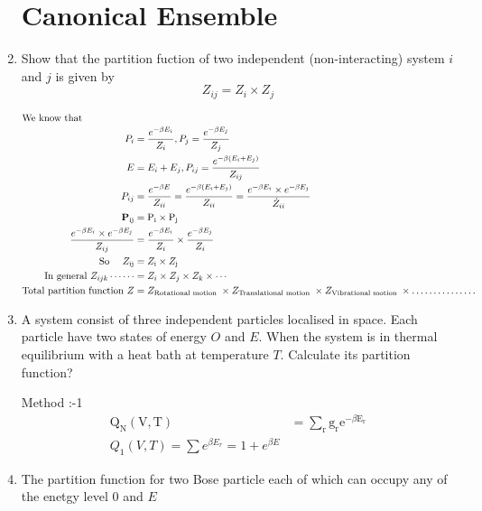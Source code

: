 \begin{enumerate}
 \section{Canonical Ensemble}
	\item Show that the partition fuction of two independent (non-interacting)
	system $i$ and $j$ is given by 
	$$Z_{ij}=Z_i\times Z_j$$
	\begin{answer}
		\begin{align*}
		\intertext{We know that}
		P_{i}&=\frac{e^{-\beta E_{i}}}{Z_{i}}, P_{j}=\frac{e^{-\beta E_{j}}}{Z_{j}}\\
		E&=E_{i}+E_{j}, P_{i j}=\frac{e^{-\beta\left(E_{i}+E_{j}\right)}}{Z_{i j}}\\
		P_{i j}&=\frac{e^{-\beta E}}{Z_{i i}}=\frac{e^{-\beta\left(E_{i}+E_{j}\right)}}{Z_{i i}}=\frac{e^{-\beta E_{i}} \times e^{-\beta E_{j}}}{\dot{Z}_{i i}}\\
		\mathbf{P}_{\mathrm{ij}}&=\mathrm{P}_{\mathrm{i}} \times \mathrm{P}_{\mathrm{j}}\\
		\frac{e^{-\beta E_{i}} \times e^{-\beta E_{j}}}{Z_{i j}}&=\frac{e^{-\beta E_{i}}}{Z_{i}} \times \frac{e^{-\beta E_{j}}}{Z_{i}}\\
		\text{So  }\quad Z_{\mathrm{ij}}&=Z_{\mathrm{i}} \times Z_{\mathrm{j}}\\
	\text{	In general }Z_{i j k} \cdots \cdots&=Z_{i} \times Z_{j} \times Z_{k} \times \cdots \\
	\text{Total partition function }Z&=Z_{\text {Rotational motion }} \times Z_{\text {Translational motion }} \times Z_{\text {Vibrational motion }} \times \ldots \ldots \ldots \ldots \ldots
		\end{align*}
	\end{answer}
	\item A system consist of three independent particles localised in space. Each particle have two states of energy $O$ and $E$. When the system is in thermal equilibrium with a heat bath at temperature $T$. Calculate its partition function? 
 	\begin{answer}
 		Method :-1
 		\begin{align*}
 		\mathrm{Q}_{\mathrm{N}}(\mathrm{V}, \mathrm{T})&=\sum_{\mathrm{r}} \mathrm{g}_{\mathrm{r}} \mathrm{e}^{-\beta \mathrm{E}_{\mathrm{r}}}\\
 		Q_1 (V,T)=\sum e^{\beta E_r}=1+e^{\beta E}
 		\end{align*}
 	\end{answer}
	\item The partition function for two Bose particle each of which can occupy any of the enetgy level $0$ and $E$ 

\end{enumerate}

